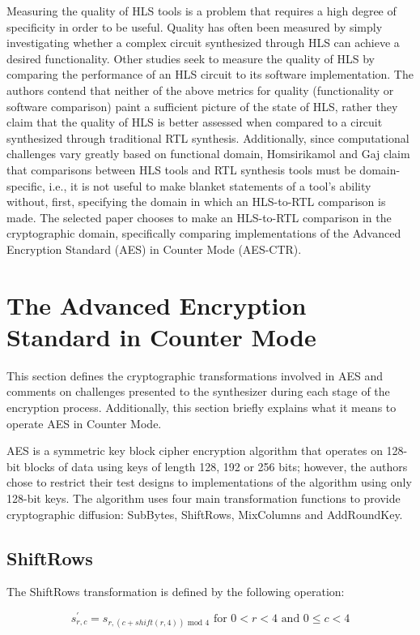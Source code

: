 \documentclass[11pt,journal,compsoc, onecolumn]{IEEEtran}
\begin{document}
Measuring the quality of HLS tools is a problem that requires a high degree of specificity in order to be useful. Quality has often been measured by simply investigating whether a complex circuit synthesized through HLS can achieve a desired functionality\cite{8}\cite{9}\cite{10}\cite{11}\cite{12}. Other studies \cite{3}\cite{4} seek to measure the quality of HLS by comparing the performance of an HLS circuit to its software implementation. The authors contend that neither of the above metrics for quality (functionality or software comparison) paint a sufficient picture of the state of HLS, rather they claim that the quality of HLS is better assessed when compared to a circuit synthesized through traditional RTL synthesis. Additionally, since computational challenges vary greatly based on functional domain, Homsirikamol and Gaj claim that comparisons between HLS tools and RTL synthesis tools must be domain-specific, i.e., it is not useful to  make blanket statements of a tool's ability without, first, specifying the domain in which an HLS-to-RTL comparison is made. The selected paper chooses to make an HLS-to-RTL comparison in the cryptographic domain, specifically comparing implementations of the Advanced Encryption Standard (AES) in Counter Mode (AES-CTR).

\section{The Advanced Encryption Standard in Counter Mode}
This section defines the cryptographic transformations involved in AES and comments on challenges presented to the synthesizer during each stage of the encryption process. Additionally, this section briefly explains what it means to operate AES in Counter Mode.


AES is a symmetric key block cipher encryption algorithm that operates on 128-bit blocks of data using keys of length 128, 192 or 256 bits; however, the authors chose to restrict their test designs to implementations of the algorithm using only 128-bit keys. The algorithm uses four main transformation functions to provide cryptographic diffusion: SubBytes, ShiftRows, MixColumns and AddRoundKey. 

\subsection{ShiftRows}
The ShiftRows transformation is defined by the following operation\cite{13}:

\begin{equation}\label{eq:shiftrows}
	s^{'}_{r,c}=s_{r,(c+shift(r,4))\text{ mod }4} \text{ for } 0<r<4 \text{ and } 0\leq c<4
\end{equation}
\end{document}
